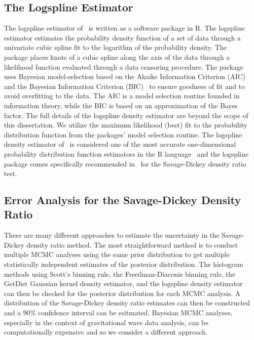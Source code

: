 \subsection{The Logspline Estimator}
The logspline estimator of~\cite{stone1997polynomial} is written as a software package in R. The logspline estimator estimates the probability density function of a set of data through a univariate cubic spline fit to the logarithm of the probability density. The package places knots of a cubic spline along the axis of the data through a likelihood function evaluated through a data censoring procedure. The package uses Bayesian model-selection based on the Akaike Information Criterion (AIC)~\citep{akaike1981likelihood} and the Bayesian Information Criterion (BIC)~\citep{schwarz1978estimating} to ensure goodness of fit and to avoid overfitting to the data. The AIC is a model selection routine founded in information theory, while the BIC is based on an approximation of the Bayes factor. The full details of the logspline density estimator are beyond the scope of this dissertation. We utilize the maximum likelihood (best) fit to the probability distribution function from the packages' model selection routine. The logspline density estimator of~\cite{stone1997polynomial} is considered one of the most accurate one-dimensional probability distribution function estimators in the R language~\cite{deng2011density} and the logspline package comes specifically recommended in~\cite{wagenmakers2010bayesian} for the Savage-Dickey density ratio test.

\subsection{Error Analysis for the Savage-Dickey Density Ratio}
There are many different approaches to estimate the uncertainty in the Savage-Dickey density ratio method.
The most straightforward method is to conduct multiple MCMC analyses using the same prior distribution to get multiple
statistically independent estimates of the posterior distribution. The histogram methods using Scott's binning rule, the
Freedman-Diaconis binning rule, the GetDist Gaussian kernel density estimator, and the logspline density estimator can then
be checked for the posterior distribution for each MCMC analysis. A distribution of the Savage-Dickey density ratio estimates can then be constructed and a $90\%$ confidence interval can be esitmated. Bayesian MCMC analyses, especially in the context of gravitational wave data analysis, can be computationally expensive and so we consider a different approach.

